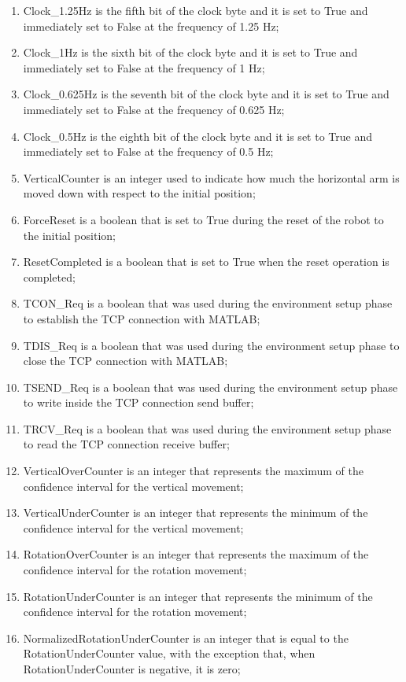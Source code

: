 \begin{enumerate}
    \item Clock\_1.25Hz is the fifth  bit of the clock byte and it is set to True and immediately set to False at the frequency of 1.25 Hz;
    \item Clock\_1Hz is the sixth bit of the clock byte and it is set to True and immediately set to False at the frequency of 1 Hz;
    \item Clock\_0.625Hz is the seventh bit of the clock byte and it is set to True and immediately set to False at the frequency of 0.625 Hz;
    \item Clock\_0.5Hz is the eighth bit of the clock byte and it is set to True and immediately set to False at the frequency of 0.5 Hz;
    \item VerticalCounter is an integer used to indicate how much the horizontal arm is moved down with respect to the initial position;
    \item ForceReset is a boolean that is set to True during the reset of the robot to the initial position;
    \item ResetCompleted is a boolean that is set to True when the reset operation is completed;
    \item TCON\_Req is a boolean that was used during the environment setup phase to establish the TCP connection with MATLAB;
    \item TDIS\_Req is a boolean that was used during the environment setup phase to close the TCP connection with MATLAB;
    \item TSEND\_Req is a boolean that was used during the environment setup phase to write inside the TCP connection send buffer;
    \item TRCV\_Req is a boolean that was used during the environment setup phase to read the TCP connection receive buffer;
    \item VerticalOverCounter is an integer that represents the maximum of the confidence interval for the vertical movement;
    \item VerticalUnderCounter is an integer  that represents the minimum  of the confidence interval for the vertical movement;
    \item RotationOverCounter is an integer that represents the maximum of the confidence interval for the rotation movement;
    \item RotationUnderCounter is an integer that represents the minimum  of the confidence interval for the rotation movement;
    \item NormalizedRotationUnderCounter is an integer that is equal to the RotationUnderCounter value, with the exception that, when RotationUnderCounter is negative, it is zero;

\end{enumerate}
